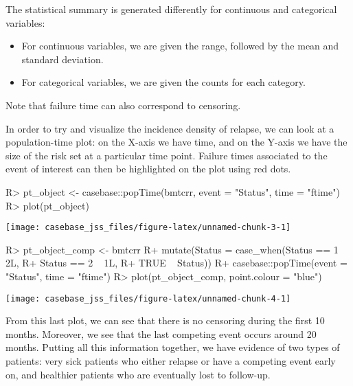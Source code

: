 \documentclass[article]{jss}
\begin{document}
The statistical summary is generated differently for continuous and
categorical variables:

\begin{itemize}
\item
  For continuous variables, we are given the range, followed by the mean
  and standard deviation.
\item
  For categorical variables, we are given the counts for each category.
\end{itemize}

Note that failure time can also correspond to censoring.

In order to try and visualize the incidence density of relapse, we can
look at a population-time plot: on the X-axis we have time, and on the
Y-axis we have the size of the risk set at a particular time point.
Failure times associated to the event of interest can then be
highlighted on the plot using red dots.

\begin{CodeChunk}

\begin{CodeInput}
R> pt_object <- casebase::popTime(bmtcrr, event = "Status", time = "ftime")
R> plot(pt_object)
\end{CodeInput}


\begin{center}\texttt{[image: casebase\_jss\_files/figure-latex/unnamed-chunk-3-1]} \end{center}

\end{CodeChunk}

\begin{CodeChunk}

\begin{CodeInput}
R> pt_object_comp <- bmtcrr %
R+     mutate(Status = case_when(Status == 1 ~ 2L, 
R+                               Status == 2 ~ 1L, 
R+                               TRUE ~ Status)) %
R+     casebase::popTime(event = "Status", time = "ftime")
R> plot(pt_object_comp, point.colour = "blue")
\end{CodeInput}


\begin{center}\texttt{[image: casebase\_jss\_files/figure-latex/unnamed-chunk-4-1]} \end{center}

\end{CodeChunk}

From this last plot, we can see that there is no censoring during the
first 10 months. Moreover, we see that the last competing event occurs
around 20 months. Putting all this information together, we have
evidence of two types of patients: very sick patients who either relapse
or have a competing event early on, and healthier patients who are
eventually lost to follow-up.
\end{document}
